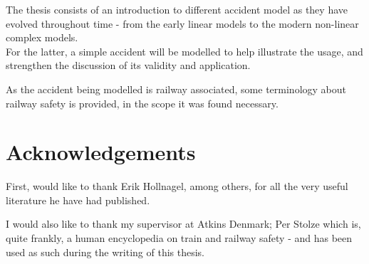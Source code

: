 \documentclass[10pt,oneside]{book}                  %
\def\thesisauthor{Kim Rostgaard Christensen}                     %
\def\thesishandin{01-April}					          %
\def\thesisyear{2012} 							          %
\begin{document}
The thesis consists of an introduction to different accident model as they have evolved throughout time - from the early linear models to the modern non-linear complex models.\\
For the latter, a simple accident will be modelled to help illustrate the usage, and strengthen the discussion of its validity and application.

As the accident being modelled is railway associated, some terminology about railway safety is provided, in the scope it was found necessary.


\markboth{}{}                                       %

\chapter{Acknowledgements}
First, would like to thank Erik Hollnagel, among others, for all the very useful literature he have had published.

I would also like to thank my supervisor at Atkins Denmark; Per Stolze which is, quite frankly, a human encyclopedia on train and railway safety - and has been used as such during the writing of this thesis.
\end{document}

